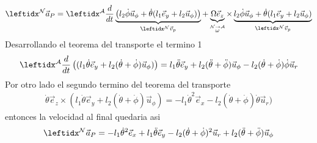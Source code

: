\begin{tcolorbox}[title=Solucion sistema Doble varilla,breakable]
    \begin{equation*}
            \marc{}{N}\vec{a}_P=\transD{l_2\dot\phi\vec{u}_\phi+\dot\theta(l_1\vec{e}_y+l_2\vec{u}_\phi)}{\Omega\vec{e}_z}{N}{A}{\marc{}{N}\vec{v}_p}
        \end{equation*}
        Desarrollando el teorema del transporte el termino 1
        \begin{align*}
            \der{}{A}\left((l_1\dot\theta\vec{e}_y+l_2(\dot\theta+\dot\phi)\vec{u}_\phi)\right)=l_1\ddot\theta\vec{e}_y+l_2(\ddot\theta+\ddot\phi)\vec{u}_\phi-l_2(\dot\theta+\dot\phi)\dot\phi\vec{u}_r
        \end{align*}
        Por otro lado el segundo termino del teorema del transporte
        \begin{align*}
            \dot \theta\vec{e}_z\times(l_1\dot\theta\vec{e}_y+l_2(\dot\theta+\dot\phi)\vec{u}_\phi)=-l_1\dot\theta^2\vec{e}_x-l_2(\dot\theta+\dot\phi)\dot\theta\vec{u}_r)
        \end{align*}
        entonces la velocidad al final quedaria asi
        $$\marc{}{N}\vec{a}_P = -l_1 \dot{\theta}^2 \vec{e}_x + l_1 \ddot{\theta} \vec{e}_y - l_2 (\dot{\theta} + \dot{\phi})^2 \vec{u}_r + l_2 (\ddot{\theta} + \ddot{\phi}) \vec{u}_\phi$$
\end{tcolorbox}


\fi
